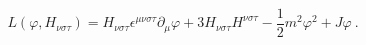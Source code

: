 \begin{equation}
L(\varphi ,H_{\nu \sigma \tau })=H_{\nu \sigma \tau }\epsilon ^{\mu \nu
\sigma \tau }\partial _{\mu }\varphi +3H_{\nu \sigma \tau }H^{\nu \sigma
\tau }-\frac{1}{2}m^{2}\varphi ^{2}+J\varphi \ .  \label{lhf}
\end{equation}%
